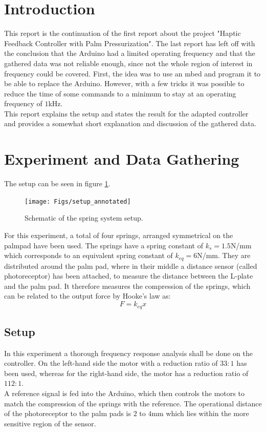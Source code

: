 	\section{Introduction}
	This report is the continuation of the first report about the project "Haptic Feedback Controller with Palm Pressurization". The last report has left off with the conclusion that the Arduino had a limited operating frequency and that the gathered data was not reliable enough, since not the whole region of interest in frequency could be covered. First, the idea was to use an mbed and program it to be able to replace the Arduino. However, with a few tricks %
	it was possible to reduce the time of some commands to a minimum to stay at an operating frequency of $1$kHz. \\
	This report explains the setup and states the result for the adapted controller and provides a somewhat short explanation and discussion of the gathered data.
	
	\section{Experiment and Data Gathering}
	The setup can be seen in figure \ref{fig:setup_annotated}.
	\begin{figure}[h!]
		\centering
		\texttt{[image: Figs/setup\_annotated]}
		\caption{Schematic of the spring system setup.}
		\label{fig:setup_annotated}
	\end{figure}
	For this experiment, a total of four springs, arranged symmetrical on the palmpad have been used. The springs have a spring constant of $k_s = 1.5$N/mm which corresponds to an equivalent spring constant of $k_{eq} = 6$N/mm. They are distributed around the palm pad, where in their middle a distance sensor (called photoreceptor) has been attached, to measure the distance between the L-plate and the palm pad. It therefore measures the compression of the springs, which can be related to the output force by Hooke's law as:
	\begin{equation}
		F = k_{eq}x 	
	\end{equation}
	
	\subsection{Setup}
	In this experiment a thorough frequency response analysis shall be done on the controller. On the left-hand side the motor with a reduction ratio of $33:1$ has been used, whereas for the right-hand side, the motor has a reduction ratio of $112:1$. \\
	A reference signal is fed into the Arduino, which then controls the motors to match the compression of the springs with the reference. The operational distance of the photoreceptor to the palm pads is $2$ to $4$mm which lies within the more sensitive region of the sensor.
	
